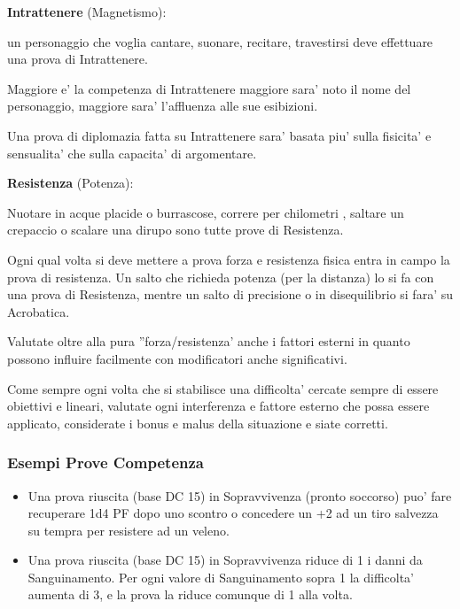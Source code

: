 \documentclass[a4paper,11pt,twoside,openany]{book}
\begin{document}
	\textbf{Intrattenere} (Magnetismo):
	
	un personaggio che voglia cantare, suonare, recitare, travestirsi deve effettuare una prova di Intrattenere.
	
	Maggiore e' la competenza di Intrattenere maggiore sara' noto il nome del personaggio, maggiore sara' l'affluenza alle sue esibizioni.
	
	Una prova di diplomazia fatta su Intrattenere sara' basata piu' sulla fisicita' e sensualita' che sulla capacita' di argomentare.
	
	\textbf{Resistenza} (Potenza):
	
	Nuotare in acque placide o burrascose, correre per chilometri , saltare un crepaccio o scalare una dirupo sono tutte prove di Resistenza.
	
	Ogni qual volta si deve mettere a prova forza e resistenza fisica entra in campo la prova di resistenza.
	Un salto che richieda potenza (per la distanza) lo si fa con una prova di Resistenza, mentre un salto di precisione o in disequilibrio si fara' su Acrobatica.
	
	Valutate oltre alla pura ''forza/resistenza' anche i fattori esterni in quanto possono influire facilmente con modificatori anche significativi.
	
	\bigskip
	
	Come sempre ogni volta che si stabilisce una difficolta' cercate sempre di essere obiettivi e lineari, valutate ogni interferenza e fattore esterno che possa essere applicato, considerate i bonus e malus della situazione e siate corretti.
	
	\subsubsection{Esempi Prove Competenza}
	
	\label{esempi-prove-competenza}
	
	\begin{itemize}
		\item Una prova riuscita (base DC 15) in Sopravvivenza (pronto soccorso) puo' fare recuperare 1d4 PF dopo uno scontro o concedere un +2 ad un tiro salvezza su tempra per resistere ad un veleno.
		\item Una prova riuscita (base DC 15) in Sopravvivenza riduce di 1 i danni da Sanguinamento. Per ogni valore di Sanguinamento sopra 1 la difficolta' aumenta di 3, e la prova la riduce comunque di 1 alla volta.
	\end{itemize}
	
\end{document}
